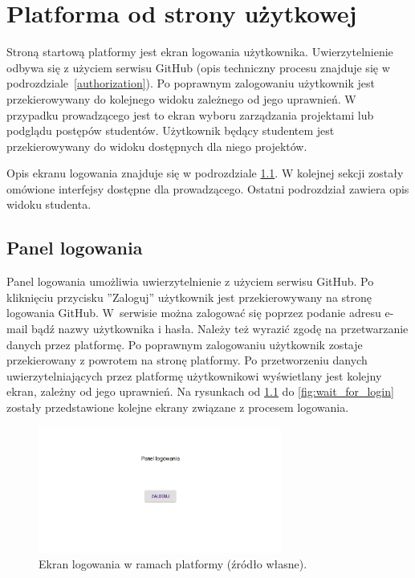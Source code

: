 \chapter{Platforma od strony użytkowej}
\label{chapter:interfaces}

Stroną startową platformy jest ekran logowania użytkownika.
Uwierzytelnienie odbywa się z użyciem serwisu GitHub (opis techniczny procesu znajduje się w podrozdziale~\ref{authorization}).
Po poprawnym zalogowaniu użytkownik jest przekierowywany do kolejnego widoku zależnego od jego uprawnień.
W przypadku prowadzącego jest to ekran wyboru zarządzania projektami lub podglądu postępów studentów.
Użytkownik będący studentem jest przekierowywany do widoku dostępnych dla niego projektów.

Opis ekranu logowania znajduje się w podrozdziale \ref{fe_login}.
W kolejnej sekcji zostały omówione interfejsy dostępne dla prowadzącego.
Ostatni podrozdział zawiera opis widoku studenta.

\section{Panel logowania}
\label{fe_login}

Panel logowania umożliwia uwierzytelnienie z użyciem serwisu GitHub.
Po kliknięciu przycisku ”Zaloguj” użytkownik jest przekierowywany na stronę logowania GitHub.
W~serwisie można zalogować się poprzez podanie adresu e-mail bądź nazwy użytkownika i hasła.
Należy też wyrazić zgodę na przetwarzanie danych przez platformę.
Po poprawnym zalogowaniu użytkownik zostaje przekierowany z powrotem na stronę platformy.
Po przetworzeniu danych uwierzytelniających przez platformę użytkownikowi wyświetlany jest kolejny ekran, zależny od jego uprawnień.
Na rysunkach od \ref{fig:log_in_button} do \ref{fig:wait_for_login} zostały przedstawione kolejne ekrany związane z procesem logowania.

\vfill

\begin{figure}[h]
    \centering
    \includegraphics[width = 8cm]{chapter04/log_in_button.png}
    \caption{Ekran logowania w ramach platformy (źródło własne).}
    \label{fig:log_in_button}
\end{figure}

